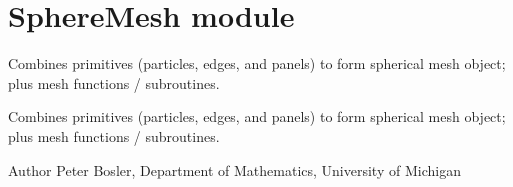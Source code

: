 \hypertarget{group___sphere_mesh}{\section{Sphere\+Mesh module}
\label{group___sphere_mesh}
}


Combines primitives (particles, edges, and panels) to form spherical mesh object; plus mesh functions / subroutines.  


Combines primitives (particles, edges, and panels) to form spherical mesh object; plus mesh functions / subroutines. 

\begin{DoxyAuthor}{Author}
Peter Bosler, Department of Mathematics, University of Michigan 
\end{DoxyAuthor}
